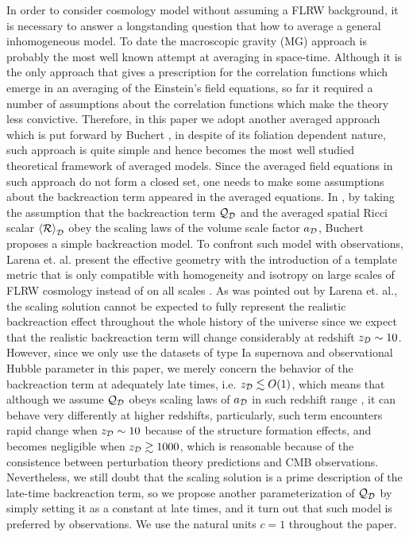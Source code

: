 \documentclass[preprint,preprintnumbers, prd, floatfix,  superscriptaddress,nofootinbib] {revtex4-1}
\newcommand{\CD}{{\cal D}}
\newcommand{\CR}{{\cal R}}
\newcommand{\average}[1]{\left\langle #1 \right\rangle_\CD}
\begin{document}
In order to consider cosmology model without assuming a FLRW background, it is necessary to answer a longstanding question that how to average a general inhomogeneous model. To date the macroscopic gravity (MG) approach \cite{zalaletdinov1992averaging,zalaletdinov1997averaging,zalaletdinov1993towards,mars1997space} is probably the most well known attempt at averaging in space-time. Although it is the only approach that gives a prescription for the correlation functions which emerge in an averaging of the Einstein's field equations, so far it required a number of assumptions about the correlation functions which make the theory less convictive. Therefore, in this paper we adopt another averaged approach which is put forward by Buchert \cite{buchert2000average,buchert2001average}, in despite of its foliation dependent nature, such approach is quite simple and hence becomes the most well studied theoretical framework of averaged models. Since the averaged field equations in such approach do not form a closed set, one needs to make some assumptions about the backreaction term appeared in the averaged equations. In \cite{buchert2006correspondence}, by taking the assumption that the backreaction term ${\cal Q}_\CD$ and the averaged spatial Ricci scalar $\average{\CR}$ obey the scaling laws of the volume scale factor $a_\CD$, Buchert
proposes a simple backreaction model. To confront such model with observations, Larena et. al. present the effective geometry with the introduction of a template metric that is only compatible with homogeneity and isotropy on large scales of FLRW cosmology instead of on all scales \cite{larena2009testing}. As was pointed out by Larena et. al., the scaling solution cannot be expected to fully represent the realistic backreaction effect throughout the whole history of the universe since we expect that the realistic backreaction term will change considerably at redshift $z_\CD\sim10$. However, since we only use the datasets of type Ia supernova and observational Hubble parameter in this paper, we merely concern the behavior of the backreaction term at adequately late times, i.e. $z_\CD\lesssim O(1)$, which means that although we assume ${\cal Q}_\CD$ obeys scaling laws of $a_\CD$ in such redshift range , it can behave very differently at higher redshifts, particularly, such term encounters rapid change when $z_\CD\sim10$ because of the structure formation effects, and becomes negligible when $z_\CD\gtrsim1000$, which is reasonable because of the consistence between perturbation theory predictions and CMB observations. Nevertheless, we still doubt that the scaling solution is a prime description of the late-time backreaction term, so we propose another parameterization of ${\cal Q}_\CD$ by simply setting it as a constant at late times, and it turn out that such model is preferred by observations. We use the natural units $c=1$ throughout the paper.
\end{document}
